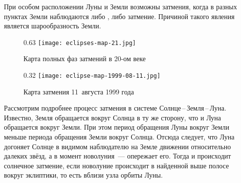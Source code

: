 При особом расположении Луны и Земли возможны  затмения, когда в разных пунктах Земли наблюдаются либо , либо  затмение. Причиной такого явления является шарообразность Земли.
 
 
 
\begin{figure}[h!]
    \begin{subcaptionblock}[t]{0.63\tw}
        \texttt{[image: eclipses-map-21.jpg]}
        \caption{Карта полных фаз затмений в 20-ом веке}
        \label{pic:eclipse-20-century}
    \end{subcaptionblock}
    \hfill
    \begin{subcaptionblock}[t]{0.32\tw}
        \texttt{[image: eclipse-map-1999-08-11.jpg]}
        \caption{Карта затмения 11~августа 1999 года}
        \label{pic:eclipse-1999-08-11}
    \end{subcaptionblock}
    \caption{}
\end{figure}

% 
%
%    

% 
%
%    

Рассмотрим подробнее процесс затмения в системе Солнце\,--\,Земля\,--\,Луна. Известно, Земля обращается вокруг Солнца в ту же сторону, что и Луна обращается вокруг Земли. При этом период обращения Луны вокруг Земли меньше периода обращения Земли вокруг Солнца. Отсюда следует, что Луна догоняет Солнце в видимом наблюдателю на Земле движении относительно далеких звёзд, а в момент новолуния~--- опережает его. Тогда и происходит солнечное затмение, если новолуние происходит в найденной выше полосе вокруг эклиптики, то есть вблизи узла орбиты Луны.

